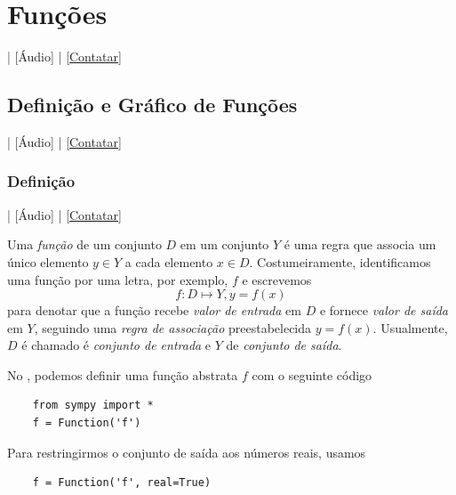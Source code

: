 
\chapter{Funções}\label{cap_funcao}
\thispagestyle{fancy}

\begin{flushright}
  [Vídeo] | [Áudio] | \href{https://phkonzen.github.io/notas/contato.html}{[Contatar]}
\end{flushright}

\section{Definição e Gráfico de Funções}\label{cap_funcao_sec_defgrafico}

\begin{flushright}
  [Vídeo] | [Áudio] | \href{https://phkonzen.github.io/notas/contato.html}{[Contatar]}
\end{flushright}

\subsection{Definição}

\begin{flushright}
  [Vídeo] | [Áudio] | \href{https://phkonzen.github.io/notas/contato.html}{[Contatar]}
\end{flushright}

Uma \emph{função} de um conjunto $D$ em um conjunto $Y$ é uma regra que associa um único elemento $y\in Y$ a cada elemento $x\in D$. Costumeiramente, identificamos uma função por uma letra, por exemplo, $f$ e escrevemos
\begin{equation}
  f:D\mapsto Y, y=f(x)
\end{equation}
para denotar que a função recebe \emph{valor de entrada} em $D$ e fornece \emph{valor de saída} em $Y$, seguindo uma \emph{regra de associação} preestabelecida $y=f(x)$. Usualmente, $D$ é chamado é \emph{conjunto de entrada} e $Y$ de \emph{conjunto de saída}.

\ifispython
\begin{obs}
  No \python, podemos definir uma função abstrata $f$ com o seguinte código
  \begin{lstlisting}
    from sympy import *
    f = Function('f')
  \end{lstlisting}
  Para restringirmos o conjunto de saída aos números reais, usamos
  \begin{lstlisting}
    f = Function('f', real=True)
  \end{lstlisting}  
\end{obs}
\fi

